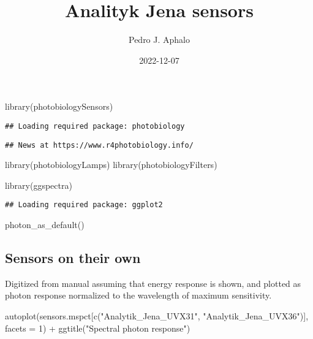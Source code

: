 \documentclass[
]{article}
\title{Analityk Jena sensors}
\author{Pedro J. Aphalo}
\date{2022-12-07}
\newenvironment{Shaded}{\begin{snugshade}}{\end{snugshade}}
\newcommand{\AttributeTok}[1]{\textcolor[rgb]{0.77,0.63,0.00}{#1}}
\newcommand{\DecValTok}[1]{\textcolor[rgb]{0.00,0.00,0.81}{#1}}
\newcommand{\FunctionTok}[1]{\textcolor[rgb]{0.00,0.00,0.00}{#1}}
\newcommand{\NormalTok}[1]{#1}
\newcommand{\SpecialCharTok}[1]{\textcolor[rgb]{0.00,0.00,0.00}{#1}}
\newcommand{\StringTok}[1]{\textcolor[rgb]{0.31,0.60,0.02}{#1}}
\begin{document}
\maketitle

\begin{Shaded}
\begin{Highlighting}[]
\FunctionTok{library}\NormalTok{(photobiologySensors)}
\end{Highlighting}
\end{Shaded}

\begin{verbatim}
## Loading required package: photobiology
\end{verbatim}

\begin{verbatim}
## News at https://www.r4photobiology.info/
\end{verbatim}

\begin{Shaded}
\begin{Highlighting}[]
\FunctionTok{library}\NormalTok{(photobiologyLamps)}
\FunctionTok{library}\NormalTok{(photobiologyFilters)}

\FunctionTok{library}\NormalTok{(ggspectra)}
\end{Highlighting}
\end{Shaded}

\begin{verbatim}
## Loading required package: ggplot2
\end{verbatim}

\begin{Shaded}
\begin{Highlighting}[]
\FunctionTok{photon\_as\_default}\NormalTok{()}
\end{Highlighting}
\end{Shaded}

\hypertarget{sensors-on-their-own}{%
\subsection{Sensors on their own}\label{sensors-on-their-own}}

Digitized from manual assuming that energy response is shown, and
plotted as photon response normalized to the wavelength of maximum
sensitivity.

\begin{Shaded}
\begin{Highlighting}[]
\FunctionTok{autoplot}\NormalTok{(sensors.mspct[}\FunctionTok{c}\NormalTok{(}\StringTok{"Analytik\_Jena\_UVX31"}\NormalTok{, }\StringTok{"Analytik\_Jena\_UVX36"}\NormalTok{)],}
         \AttributeTok{facets =} \DecValTok{1}\NormalTok{) }\SpecialCharTok{+}
  \FunctionTok{ggtitle}\NormalTok{(}\StringTok{"Spectral photon response"}\NormalTok{)}
\end{Highlighting}
\end{Shaded}
\end{document}
